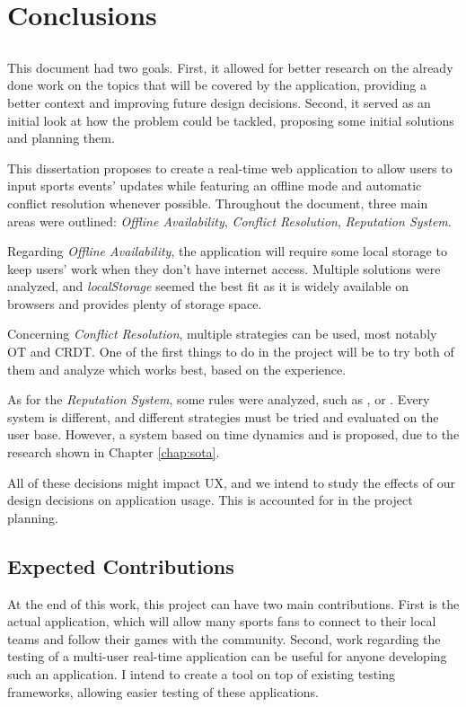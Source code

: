 \chapter{Conclusions} \label{chap:concl}

\section*{}

This document had two goals. First, it allowed for better research on the already done work on the topics that will be covered by the application, providing a better context and improving future design decisions. Second, it served as an initial look at how the problem could be tackled, proposing some initial solutions and planning them.

This dissertation proposes to create a real-time web application to allow users to input sports events' updates while featuring an offline mode and automatic conflict resolution whenever possible. Throughout the document, three main areas were outlined: \textit{Offline Availability}, \textit{Conflict Resolution}, \textit{Reputation System}. 

Regarding \textit{Offline Availability}, the application will require some local storage to keep users' work when they don't have internet access. Multiple solutions were analyzed, and \textit{localStorage} seemed the best fit as it is widely available on browsers and provides plenty of storage space.

Concerning \textit{Conflict Resolution}, multiple strategies can be used, most notably OT and CRDT. One of the first things to do in the project will be to try both of them and analyze which works best, based on the experience.

As for the \textit{Reputation System}, some rules were analyzed, such as , or . Every system is different, and different strategies must be tried and evaluated on the user base. However, a system based on time dynamics and  is proposed, due to the research shown in Chapter \ref{chap:sota}.

All of these decisions might impact UX, and we intend to study the effects of our design decisions on application usage. This is accounted for in the project planning.

\section{Expected Contributions}
At the end of this work, this project can have two main contributions. First is the actual application, which will allow many sports fans to connect to their local teams and follow their games with the community. Second, work regarding the testing of a multi-user real-time application can be useful for anyone developing such an application. I intend to create a tool on top of existing testing frameworks, allowing easier testing of these applications.

\vspace*{12mm}